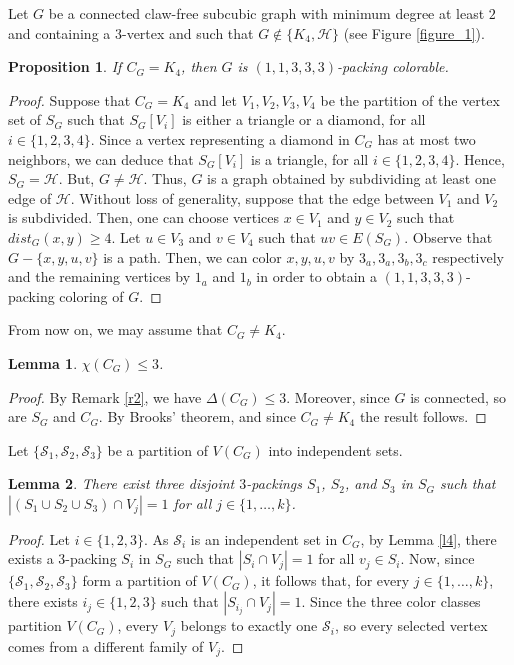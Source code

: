\documentclass[12pt, oneside]{scrartcl}
\newtheorem{lemma}{Lemma}%
\newtheorem{proposition}{Proposition}%
\begin{document}
Let $G$ be a connected claw-free subcubic graph with minimum degree at least $2$ and containing a $3$-vertex and such that $G\notin \{K_4,\mathcal{H}\}$ (see Figure \ref{figure_1}).

\begin{proposition}\label{prop1}
    If $C_G=K_4$, then $G$ is $(1,1,3,3,3)$-packing colorable.
\end{proposition}
\begin{proof}
    Suppose that $C_G=K_4$ and let $V_1,V_2,V_3,V_4$ be the partition of the vertex set of $S_G$ such that $S_G[V_i]$ is either a triangle or a diamond, for all $i\in \{1,2,3,4\}$. Since a vertex representing a diamond in $C_G$ has at most two neighbors, we can deduce that $S_G[V_i]$ is a triangle, for all $i\in \{1,2,3,4\}$. Hence, $S_G=\mathcal{H}$. But, $G\neq \mathcal{H}$. Thus, $G$ is a graph obtained by subdividing at least one edge of $\mathcal{H}$. Without loss of generality, suppose that the edge between $V_1$ and $V_2$ is subdivided. Then, one can choose vertices $x\in V_1$ and $y\in V_2$ such that $dist_G(x,y)\geq 4$. Let $u\in V_3$ and $v\in V_4$ such that $uv\in E(S_G)$. Observe that $G-\{x,y,u,v\}$ is a path. Then, we can color $x,y,u,v$ by $3_a,3_a,3_b,3_c$ respectively and the remaining vertices by $1_a$ and $1_b$ in order to obtain a $(1,1,3,3,3)$-packing coloring of $G$.
\end{proof}

From now on, we may assume that $C_G\neq K_4$.
\begin{lemma}\label{l8}
    $\chi(C_G)\leq 3$.
\end{lemma}
\begin{proof}
   By Remark \ref{r2}, we have $\Delta(C_G)\leq 3$. Moreover, since $G$ is connected, so are $S_G$ and $C_G$. By Brooks' theorem, and since $C_G\neq K_4$ the result follows.
\end{proof}

Let $\{\mathcal{S}_1,\mathcal{S}_2,\mathcal{S}_3\}$ be a partition of $V(C_G)$ into independent sets.

\begin{lemma}\label{l9}
    There exist three disjoint $3$-packings $S_1$, $S_2$, and $S_3$ in $S_G$ such that $|(S_1\cup S_2\cup S_3)\cap V_j|=1$ for all $j\in \{1,\dots ,k\}$.
\end{lemma}
\begin{proof}
    Let $i\in \{1,2,3\}$. As $\mathcal{S}_i$ is an independent set in $C_G$, by Lemma \ref{l4}, there exists a $3$-packing $S_i$ in $S_G$ such that $|S_i\cap V_j|=1$ for all $v_j\in S_i$. Now, since $\{\mathcal{S}_1,\mathcal{S}_2,\mathcal{S}_3\}$ form a partition of $V(C_G)$, it follows that, for every $j\in \{1,\dots ,k\}$, there exists $i_j\in \{1,2,3\}$ such that $|S_{i_j}\cap V_j|=1$.
    Since the three color classes partition $V(C_G)$, every $V_j$ belongs to exactly one $\mathcal S_i$, so every selected vertex comes from a different family of $V_j$.
\end{proof}
\end{document}
